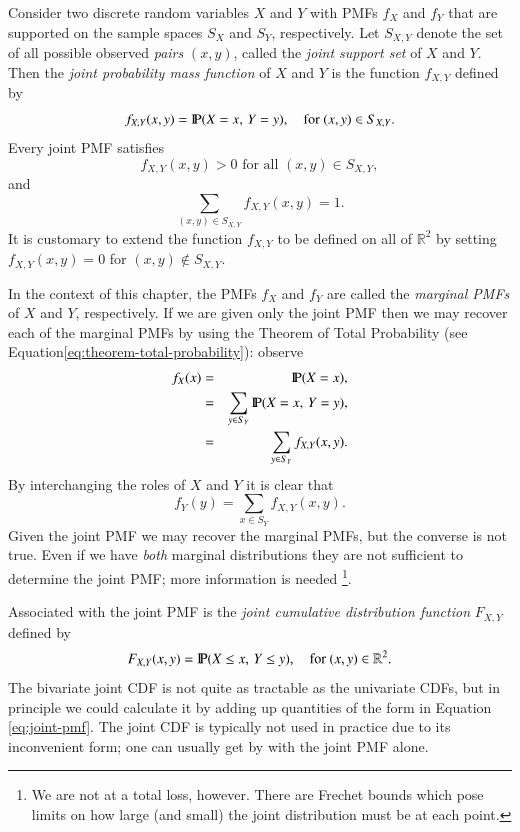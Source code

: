 \documentclass[captions=tableheading]{scrbook}
\begin{document}
Consider two discrete random variables \(X\) and \(Y\) with PMFs \(f_{X}\) and \(f_{Y}\) that are supported on the sample spaces \(S_{X}\) and \(S_{Y}\), respectively. Let \(S_{X,Y}\) denote the set of all possible observed \emph{pairs} \((x,y)\), called the \emph{joint support set} of \(X\) and \(Y\). Then the \emph{joint probability mass function} of \(X\) and \(Y\) is the function \(f_{X,Y}\) defined by
\begin{equation}
f_{X,Y}(x,y)=\P(X=x,\, Y=y),\quad\mbox{for }(x,y)\in S_{X,Y}.\label{eq:joint-pmf}
\end{equation}
Every joint PMF satisfies
\begin{equation}
f_{X,Y}(x,y)>0\mbox{ for all }(x,y)\in S_{X,Y},
\end{equation}
and
\begin{equation}
\sum_{(x,y)\in S_{X,Y}}f_{X,Y}(x,y)=1.
\end{equation}
It is customary to extend the function \(f_{X,Y}\) to be defined on all of \(\mathbb{R}^{2}\) by setting \(f_{X,Y}(x,y)=0\) for \((x,y)\not\in S_{X,Y}\). 

In the context of this chapter, the PMFs \(f_{X}\) and \(f_{Y}\) are called the \emph{marginal PMFs} of \(X\) and \(Y\), respectively. If we are given only the joint PMF then we may recover each of the marginal PMFs by using the Theorem of Total Probability (see Equation\ref{eq:theorem-total-probability}): observe
\begin{eqnarray}
f_{X}(x) & = & \P(X=x),\\
 & = & \sum_{y\in S_{Y}}\P(X=x,\, Y=y),\\
 & = & \sum_{y\in S_{Y}}f_{X,Y}(x,y).
\end{eqnarray}
By interchanging the roles of \(X\) and \(Y\) it is clear that 
\begin{equation}
f_{Y}(y)=\sum_{x\in S_{Y}}f_{X,Y}(x,y).\label{eq:marginal-pmf}
\end{equation}
Given the joint PMF we may recover the marginal PMFs, but the converse is not true. Even if we have \emph{both} marginal distributions they are not sufficient to determine the joint PMF; more information is needed
\footnote{We are not at a total loss, however. There are Frechet bounds which pose limits on how large (and small) the joint distribution must be at each point.}.

Associated with the joint PMF is the \emph{joint cumulative distribution function} \(F_{X,Y}\) defined by
\[
F_{X,Y}(x,y)=\P(X\leq x,\, Y\leq y),\quad\mbox{for }(x,y)\in\mathbb{R}^{2}.
\]
The bivariate joint CDF is not quite as tractable as the univariate CDFs, but in principle we could calculate it by adding up quantities of the form in Equation \ref{eq:joint-pmf}. The joint CDF is typically not used in practice due to its inconvenient form; one can usually get by with the joint PMF alone.
\end{document}
